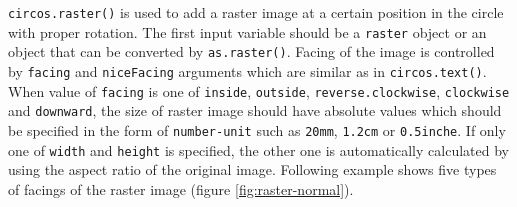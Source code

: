 \documentclass[]{book}
\newenvironment{Shaded}{\begin{snugshade}}{\end{snugshade}}
\newcommand{\KeywordTok}[1]{\textcolor[rgb]{0.13,0.29,0.53}{\textbf{#1}}}
\newcommand{\DataTypeTok}[1]{\textcolor[rgb]{0.13,0.29,0.53}{#1}}
\newcommand{\DecValTok}[1]{\textcolor[rgb]{0.00,0.00,0.81}{#1}}
\newcommand{\StringTok}[1]{\textcolor[rgb]{0.31,0.60,0.02}{#1}}
\newcommand{\OtherTok}[1]{\textcolor[rgb]{0.56,0.35,0.01}{#1}}
\newcommand{\ControlFlowTok}[1]{\textcolor[rgb]{0.13,0.29,0.53}{\textbf{#1}}}
\newcommand{\OperatorTok}[1]{\textcolor[rgb]{0.81,0.36,0.00}{\textbf{#1}}}
\newcommand{\NormalTok}[1]{#1}
\theoremstyle{definition}
\theoremstyle{definition}
\theoremstyle{remark}
\begin{document}
\texttt{circos.raster()} is used to add a raster image at a certain
position in the circle with proper rotation. The first input variable
should be a \texttt{raster} object or an object that can be converted by
\texttt{as.raster()}. Facing of the image is controlled by
\texttt{facing} and \texttt{niceFacing} arguments which are similar as
in \texttt{circos.text()}. When value of \texttt{facing} is one of
\texttt{inside}, \texttt{outside}, \texttt{reverse.clockwise},
\texttt{clockwise} and \texttt{downward}, the size of raster image
should have absolute values which should be specified in the form of
\texttt{number-unit} such as \texttt{20mm}, \texttt{1.2cm} or
\texttt{0.5inche}. If only one of \texttt{width} and \texttt{height} is
specified, the other one is automatically calculated by using the aspect
ratio of the original image. Following example shows five types of
facings of the raster image (figure \ref{fig:raster-normal}).

\begin{Shaded}
\end{Shaded}
\end{document}
